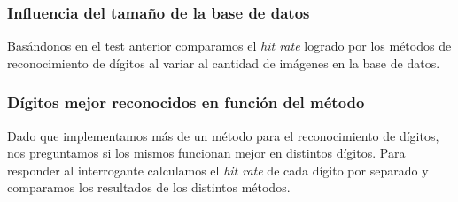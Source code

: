 	\subsubsection{Influencia del tama\~no de la base de datos}
		Bas\'andonos en el test anterior comparamos el \textit{hit rate} logrado
		por los m\'etodos de reconocimiento de d\'igitos al variar al cantidad
		de im\'agenes en la base de datos.
		
	\subsubsection{D\'igitos mejor reconocidos en funci\'on del m\'etodo}
		Dado que implementamos m\'as de un m\'etodo para el reconocimiento de
		d\'igitos, nos preguntamos si los mismos funcionan mejor en distintos
		d\'igitos. Para responder al interrogante calculamos el \textit{hit rate}
		de cada d\'igito por separado y comparamos los resultados de los
		distintos m\'etodos.
